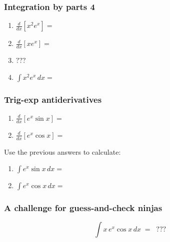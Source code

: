 \documentclass[14pt]{beamer}
\begin{document}
\begin{frame}[t]
	\frametitle{Integration by parts 4}

	\begin{enumerate}
		\item $\displaystyle \frac{d}{dx}\left[ x^{2}e^{x}\right] =$
			\vspace{.1cm}
			\vspace{.1cm}

		\item $\displaystyle \frac{d}{dx}\left[ x e^{x}\right] =$
			\vspace{.5cm}

		\item $\displaystyle ???$
			\vspace{.5cm}

		\item $\displaystyle \int x^{2}e^{x}\, dx =$
	\end{enumerate}
\end{frame}

\begin{frame}[t]
	\frametitle{Trig-exp antiderivatives}

	\begin{enumerate}
		\item $\displaystyle \frac{d}{dx}\left[ e^{x}\sin x \right]=$
			\vspace{.1cm}
			\vspace{.1cm}

		\item $\displaystyle \frac{d}{dx}\left[ e^{x}\cos x \right]=$
	\end{enumerate}
	\vspace{.5cm}
	Use the previous answers to calculate:
	\vspace{.3cm}
	\begin{enumerate}
		\addtocounter{enumi}{2}

		\item $\displaystyle \int e^{x}\sin x \, dx =$
			\vspace{.1cm}
			\vspace{.1cm}

		\item $\displaystyle \int e^{x}\cos x \, dx =$
	\end{enumerate}
\end{frame}

\begin{frame}[t]
	\frametitle{A challenge for guess-and-check ninjas}
	\[
		\int x \, e^{x}\cos x \, dx \; = \; \; ???
	\]
\end{frame}
\end{document}
